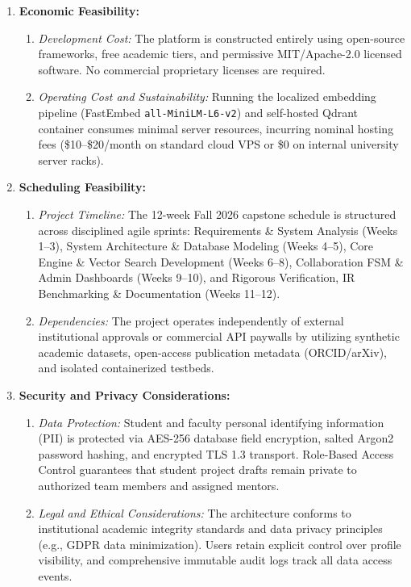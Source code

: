 \begin{enumerate}[label=\textbf{\arabic*.}]
    \item \textbf{Economic Feasibility:}
    \begin{enumerate}[label=(\alph*)]
        \item \textit{Development Cost:} The platform is constructed entirely using open-source frameworks, free academic tiers, and permissive MIT/Apache-2.0 licensed software. No commercial proprietary licenses are required.
        \item \textit{Operating Cost and Sustainability:} Running the localized embedding pipeline (FastEmbed \texttt{all-MiniLM-L6-v2}) and self-hosted Qdrant container consumes minimal server resources, incurring nominal hosting fees (\$10--\$20/month on standard cloud VPS or \$0 on internal university server racks).
    \end{enumerate}

    \item \textbf{Scheduling Feasibility:}
    \begin{enumerate}[label=(\alph*)]
        \item \textit{Project Timeline:} The 12-week Fall 2026 capstone schedule is structured across disciplined agile sprints: Requirements \& System Analysis (Weeks 1--3), System Architecture \& Database Modeling (Weeks 4--5), Core Engine \& Vector Search Development (Weeks 6--8), Collaboration FSM \& Admin Dashboards (Weeks 9--10), and Rigorous Verification, IR Benchmarking \& Documentation (Weeks 11--12).
        \item \textit{Dependencies:} The project operates independently of external institutional approvals or commercial API paywalls by utilizing synthetic academic datasets, open-access publication metadata (ORCID/arXiv), and isolated containerized testbeds.
    \end{enumerate}

    \item \textbf{Security and Privacy Considerations:}
    \begin{enumerate}[label=(\alph*)]
        \item \textit{Data Protection:} Student and faculty personal identifying information (PII) is protected via AES-256 database field encryption, salted Argon2 password hashing, and encrypted TLS 1.3 transport. Role-Based Access Control guarantees that student project drafts remain private to authorized team members and assigned mentors.
        \item \textit{Legal and Ethical Considerations:} The architecture conforms to institutional academic integrity standards and data privacy principles (e.g., GDPR data minimization). Users retain explicit control over profile visibility, and comprehensive immutable audit logs track all data access events.
    \end{enumerate}
\end{enumerate}

